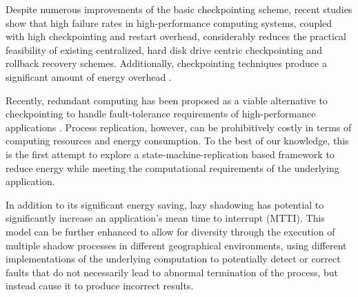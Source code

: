 Despite numerous improvements of the basic checkpointing scheme,
recent studies show that high failure rates in high-performance
computing systems, coupled with high checkpointing and restart
overhead, considerably reduces the practical feasibility of existing
centralized, hard disk drive centric checkpointing and rollback
recovery schemes. Additionally, checkpointing techniques produce a
significant amount of energy overhead \cite{diouri_dsn_2012}.

Recently, redundant computing has been proposed as a viable
alternative to checkpointing to handle fault-tolerance requirements of
high-performance applications \cite{ferreira_hpc_2011,riesen_sandia_2010}. Process replication, however, can be
prohibitively costly in terms of computing resources and energy
consumption. To the best of our knowledge, this is the first attempt
to explore a state-machine-replication based framework to reduce
energy while meeting the computational requirements of the underlying
application.

In addition to its significant energy saving, lazy shadowing has
potential to significantly increase an application's mean time to
interrupt (MTTI). This model can be further enhanced to allow for
diversity through the execution of multiple shadow processes in
different geographical environments, using different implementations
of the underlying computation to potentially detect or correct faults
that do not necessarily lead to abnormal termination of the process,
but instead cause it to produce incorrect results.

